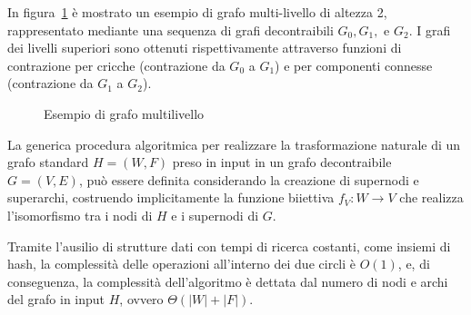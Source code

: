     In figura~\ref{fig:multi-level-graph-example} \`e mostrato un esempio di grafo multi-livello di altezza 2,
    rappresentato mediante una sequenza di grafi decontraibili $G_0, G_1,$ e $G_2$. I grafi dei livelli superiori
    sono ottenuti rispettivamente attraverso funzioni di contrazione per cricche (contrazione da $G_0$ a $G_1$) e
    per componenti connesse (contrazione da $G_1$ a $G_2$).

    \begin{figure}
        
        \caption{Esempio di grafo multilivello}
        \label{fig:multi-level-graph-example}
    \end{figure}

    \newpage

    \label{subsec:algoritmo-di-trasformazione-naturale}

    La generica procedura algoritmica per realizzare la trasformazione naturale di un grafo standard $H = (W, F)$
    preso in input in un grafo decontraibile $G = (V, E)$, può essere definita considerando la creazione di supernodi
    e superarchi, costruendo implicitamente la funzione biiettiva $f_V: W \rightarrow V$ che realizza l'isomorfismo tra i nodi
    di $H$ e i supernodi di $G$.

    

    Tramite l'ausilio di strutture dati con tempi di ricerca costanti, come insiemi di hash, la complessit\`a delle
    operazioni all'interno dei due circli \`e $O(1)$,
    e, di conseguenza, la complessit\`a dell'algoritmo \`e dettata dal numero di nodi e archi del grafo in input $H$,
    ovvero $\Theta(|W| + |F|)$.